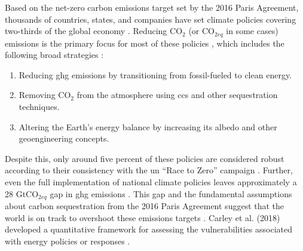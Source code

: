Based on the net-zero carbon emissions target set by the 2016 Paris Agreement,
thousands of countries, states, and companies have set climate policies covering
two-thirds of the global economy \cite{hale_assessing_2022}. Reducing CO$_2$ (or
CO$_{2eq}$ in some cases) emissions is the primary focus for most of these
policies \cite{fawzy_strategies_2020, roelfsema_taking_2020,
hale_assessing_2022}, which includes the following broad strategies
\cite{fawzy_strategies_2020}:
\begin{enumerate}
    \item Reducing \ac{ghg} emissions by transitioning from fossil-fueled to
    clean energy.
    \item Removing CO$_2$ from the atmosphere using \ac{ccs} and other
    sequestration techniques.
    \item Altering the Earth's energy balance by increasing its albedo and other
    geoengineering concepts.
\end{enumerate}
Despite this, only around five percent of these policies are considered
robust according to their consistency with the \ac{un} ``Race to Zero'' campaign
\cite{hale_assessing_2022}. Further, even the full implementation of national
climate policies leaves approximately  a 28 GtCO$_{2eq}$ gap in \ac{ghg}
emissions \cite{roelfsema_taking_2020}. This gap and the fundamental
assumptions about carbon sequestration from the 2016 Paris Agreement suggest
that the world is on track to overshoot these emissions targets
\cite{roelfsema_taking_2020,taylor_managing_2021}. Carley et al. (2018)
developed a quantitative framework for assessing the vulnerabilities associated
with energy policies or responses \cite{carley_framework_2018}.


